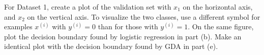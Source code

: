 \clearpage
\item {}
For Dataset 1, create a plot of the validation set with $x_1$ on the horizontal
axis, and $x_2$ on the vertical axis. To visualize the two classes, use a
different symbol for examples $x^{(i)}$ with $y^{(i)} = 0$ than for those with
$y^{(i)} = 1$. On the same figure, plot the decision boundary found by logistic
regression in part (b). Make an identical plot with the decision boundary found
by GDA in part (e).

\ifnum{} {

} \fi
